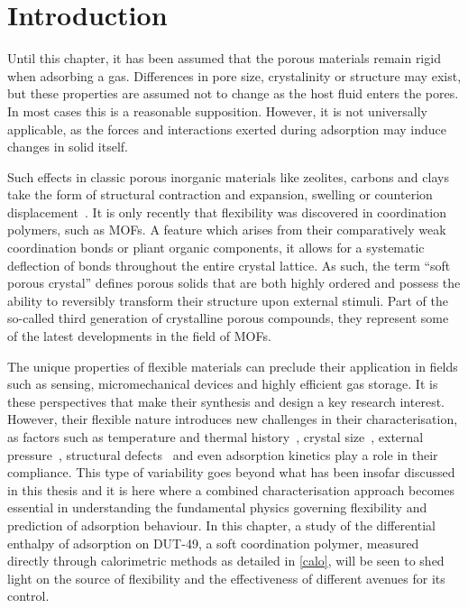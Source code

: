 
\section{Introduction}

Until this chapter, it has been assumed that the porous materials 
remain rigid when adsorbing a gas. Differences in pore size, crystalinity 
or structure may exist, but these properties are assumed not to change
as the host fluid enters the pores.
In most cases this is a reasonable supposition. However, it is not 
universally applicable, as the forces and interactions exerted 
during adsorption may induce changes in solid itself.

Such effects in classic porous inorganic materials like zeolites, carbons 
and clays take the form of structural contraction and expansion, swelling
or counterion displacement~\cite{coudertMolecularInsightCO2017}.
It is only recently that flexibility was discovered in coordination
polymers, such as MOFs. A feature which arises from 
their comparatively weak coordination bonds or pliant organic components,
it allows for a systematic deflection of bonds throughout the 
entire crystal lattice.
As such, the term ``soft porous crystal'' defines porous solids that are 
both highly ordered and possess the ability to reversibly transform
their structure upon external stimuli. Part of the so-called
third generation of crystalline porous compounds, they represent 
some of the latest developments in the field of MOFs.

The unique properties of flexible materials can preclude
their application in fields such as sensing, micromechanical
devices and highly efficient gas storage. It is these perspectives
that make their synthesis and design a key research interest.
However, their flexible nature introduces new challenges in
their characterisation, as factors such as temperature and
thermal history~\cite{liuReversibleStructuralTransition2008},
crystal size~\cite{zhangCrystalSizeDependentStructuralTransitions2014, %
krauseEffectCrystalliteSize2018}, external 
pressure~\cite{itoReversiblePoreSize2013, %
chanutUsingExternalFactors2016}, structural defects~\cite{bennettInterplayDefectsDisorder2016} 
and even adsorption kinetics play a role in their compliance.
This type of variability goes beyond what has been insofar discussed
in this thesis and it is here where a combined characterisation approach
becomes essential in understanding the fundamental physics
governing flexibility and prediction of adsorption behaviour.
In this chapter, a study of the differential enthalpy of adsorption
on DUT-49, a soft coordination polymer,
measured directly through calorimetric methods as detailed in 
\autoref{calo}, will be seen to shed light on the source of 
flexibility and the effectiveness of different avenues for its
control.

